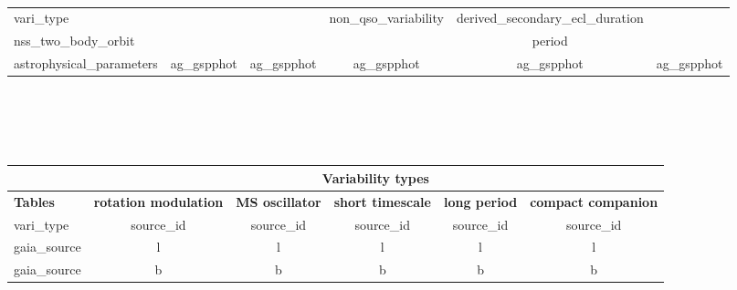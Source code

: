 \documentclass[12pt,a4paper]{article}
\begin{document}
\begin{table}[h]
\begin{subtable}[h]{0.45\textwidth}
\begin{tabular}{lccccc}
\multicolumn{1}{l|}{vari\_type}               &                                                                                    &                                                                                    & non\_qso\_variability           & derived\_secondary\_ecl\_duration &                       \\
\multicolumn{1}{l|}{nss\_two\_body\_orbit}    &                                                                                    &                                                                                    &                                 & period                            &                       \\ 
\multicolumn{1}{l|}{astrophysical\_parameters} &                ag\_gspphot                    &     ag\_gspphot                &                                ag\_gspphot           &        ag\_gspphot                     &            ag\_gspphot                              \\
\hline
\end{tabular}
       \caption{}
       \label{tab:week1}
    \end{subtable}
    \hfill \\ \\ \\
    \begin{subtable}[h]{0.45\textwidth}
        \centering
       \tiny
\begin{tabular}{lccccc}
\cline{2-6} 
	& \multicolumn{5}{c}{\textbf{Variability types}}           
\\ \hline   \hline                                                                                                                             
\multicolumn{1}{l|}{\textbf{Tables}}           & \textbf{rotation modulation}       & \textbf{MS oscillator} & \textbf{short timescale}    & \textbf{long period} & \textbf{compact companion} \\ \hline
\multicolumn{1}{l|}{vari\_type}                &                 source\_id                        &      source\_id                    &            source\_id                   &        source\_id                                    &         source\_id                     \\
\multicolumn{1}{l|}{gaia\_source}              &         l                           &         l               &           l                  &         l                                 &         l                   \\
\multicolumn{1}{l|}{gaia\_source}              &          b                          &           b             &           b                  &                    b                      &          b                  \\

\end{tabular}
\end{subtable}
\end{table}
\end{document}
